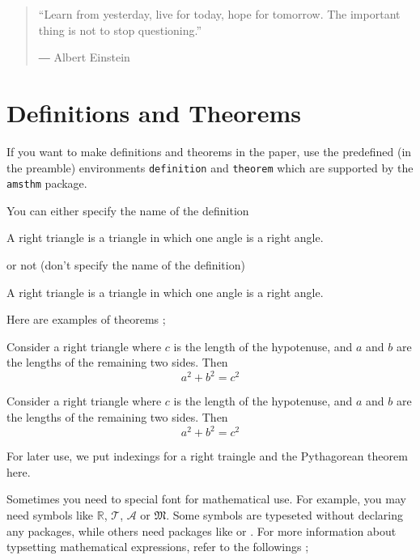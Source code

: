 \begin{quotation}
“Learn from yesterday, live for today, hope for tomorrow. The important thing is not to stop questioning.” \par
― Albert Einstein 
\end{quotation}

\section{Definitions and Theorems}

If you want to make definitions and theorems in the paper, use the predefined (in the preamble) environments \texttt{definition} and \texttt{theorem} which are supported by the \texttt{amsthm} package.

You can either specify the name of the definition
\begin{definition}
A right triangle is a triangle in which one angle is a right angle.
\end{definition}
or not (don't specify the name of the definition)
\begin{definition}
A right triangle is a triangle in which one angle is a right angle.
\end{definition}

Here are examples of theorems ;
\begin{theorem}
Consider a right triangle where \(c\) is the length of the hypotenuse, and \(a\) and \(b\) are the lengths of the remaining two sides.
Then
\begin{equation}
a^2+b^2=c^2
\end{equation}
\end{theorem}

\begin{theorem}
Consider a right triangle where \(c\) is the length of the hypotenuse, and \(a\) and \(b\) are the lengths of the remaining two sides.
Then
\begin{equation}
a^2+b^2=c^2
\end{equation}
\end{theorem}
For later use, we put indexings for a right traingle and the Pythagorean theorem here.

Sometimes you need to special font for mathematical use.
For example, you may need symbols like \(\mathbb R\), \(\mathcal T\), \(\mathscr A\) or \(\mathfrak M\).
Some symbols are typeseted without declaring any packages, while others need packages like  or .
For more information about typsetting mathematical expressions, refer to the followings ;

